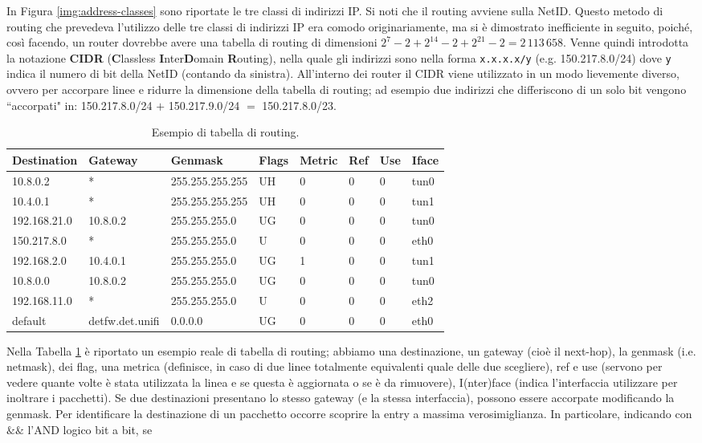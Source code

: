 In Figura \ref{img:address-classes} sono riportate le tre classi di indirizzi IP. Si noti che il routing avviene sulla NetID. Questo metodo di routing che prevedeva l'utilizzo delle tre classi di indirizzi IP era comodo originariamente, ma si è dimostrato inefficiente in seguito, poiché, così facendo, un router dovrebbe avere una tabella di routing di dimensioni $2^7-2+2^{14}-2+2^{21}-2 = 2\,113\,658$. Venne quindi introdotta la notazione \textbf{CIDR} (\textbf{C}lassless \textbf{I}nter\textbf{D}omain \textbf{R}outing), nella quale gli indirizzi sono nella forma \texttt{x.x.x.x/y} (e.g. 150.217.8.0/24) dove \texttt{y} indica il numero di bit della NetID (contando da sinistra). All'interno dei router il CIDR viene utilizzato in un modo lievemente diverso, ovvero per accorpare linee e ridurre la dimensione della tabella di routing; ad esempio due indirizzi che differiscono di un solo bit vengono \textquotedblleft accorpati" in: 150.217.8.0/24 $+$ 150.217.9.0/24 $=$ 150.217.8.0/23.
\begin{table}[htbp]
	\centering
	\begin{tabular}{|l|l|l|l|l|l|l|l|}
		\hline
		\textbf{Destination} & \textbf{Gateway} & \textbf{Genmask} & \textbf{Flags} & \textbf{Metric} & \textbf{Ref} & \textbf{Use} & \textbf{Iface} \\ \hline
		10.8.0.2 & * & 255.255.255.255 & UH & 0 & 0 & 0 & tun0 \\ \hline
		10.4.0.1 & * & 255.255.255.255 & UH & 0 & 0 & 0 & tun1 \\ \hline
		192.168.21.0 & 10.8.0.2 & 255.255.255.0 & UG & 0 & 0 & 0 & tun0 \\ \hline
		150.217.8.0 & * & 255.255.255.0 & U & 0 & 0 & 0 & eth0 \\ \hline
		192.168.2.0 & 10.4.0.1 & 255.255.255.0 & UG & 1 & 0 & 0 & tun1 \\ \hline
		10.8.0.0 & 10.8.0.2 & 255.255.255.0 & UG & 0 & 0 & 0 & tun0 \\ \hline
		192.168.11.0 & * & 255.255.255.0 & U & 0 & 0 & 0 & eth2 \\ \hline
		default & detfw.det.unifi & 0.0.0.0 & UG & 0 & 0 & 0 & eth0 \\ \hline
	\end{tabular}
	\caption{Esempio di tabella di routing.}
	\label{tab:routing-table-example}
\end{table}
Nella Tabella \ref{tab:routing-table-example} è riportato un esempio reale di tabella di routing; abbiamo una destinazione, un gateway (cioè il next-hop), la genmask (i.e. netmask), dei flag, una metrica (definisce, in caso di due linee totalmente equivalenti quale delle due scegliere), ref e use (servono per vedere quante volte è stata utilizzata la linea e se questa è aggiornata o se è da rimuovere), I(nter)face (indica l'interfaccia utilizzare per inoltrare i pacchetti). Se due destinazioni presentano lo stesso gateway (e la stessa interfaccia), possono essere accorpate modificando la genmask. Per identificare la destinazione di un pacchetto occorre scoprire la entry a massima verosimiglianza. In particolare, indicando con $\&\&$ l'AND logico bit a bit, se
